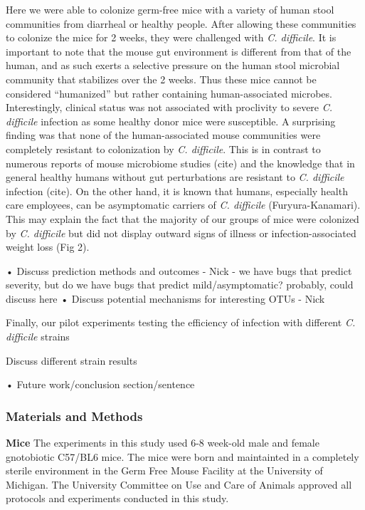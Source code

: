 \documentclass[11pt,]{article}
\begin{document}
Here we were able to colonize germ-free mice with a variety of human
stool communities from diarrheal or healthy people. After allowing these
communities to colonize the mice for 2 weeks, they were challenged with
\emph{C. difficile}. It is important to note that the mouse gut
environment is different from that of the human, and as such exerts a
selective pressure on the human stool microbial community that
stabilizes over the 2 weeks. Thus these mice cannot be considered
``humanized'' but rather containing human-associated microbes.
Interestingly, clinical status was not associated with proclivity to
severe \emph{C. difficile} infection as some healthy donor mice were
susceptible. A surprising finding was that none of the human-associated
mouse communities were completely resistant to colonization by \emph{C.
difficile}. This is in contrast to numerous reports of mouse microbiome
studies (cite) and the knowledge that in general healthy humans without
gut perturbations are resistant to \emph{C. difficile} infection (cite).
On the other hand, it is known that humans, especially health care
employees, can be asymptomatic carriers of \emph{C. difficile}
(Furyura-Kanamari). This may explain the fact that the majority of our
groups of mice were colonized by \emph{C. difficile} but did not display
outward signs of illness or infection-associated weight loss (Fig 2).

• Discuss prediction methods and outcomes - Nick - we have bugs that
predict severity, but do we have bugs that predict mild/asymptomatic?
probably, could discuss here • Discuss potential mechanisms for
interesting OTUs - Nick

Finally, our pilot experiments testing the efficiency of infection with
different \emph{C. difficile} strains

Discuss different strain results

• Future work/conclusion section/sentence

\subsubsection{Materials and Methods}\label{materials-and-methods}

\textbf{Mice} The experiments in this study used 6-8 week-old male and
female gnotobiotic C57/BL6 mice. The mice were born and maintainted in a
completely sterile environment in the Germ Free Mouse Facility at the
University of Michigan. The University Committee on Use and Care of
Animals approved all protocols and experiments conducted in this study.
\end{document}

